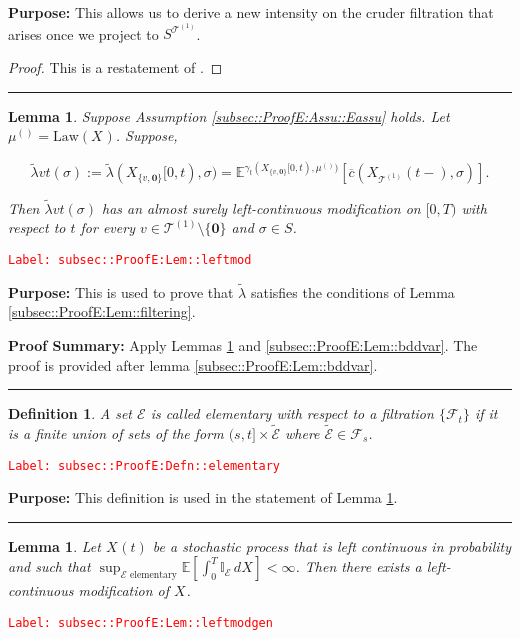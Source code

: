 \documentclass[12pt]{article}
\newcommand{\mb}{\mathbb}
\newcommand{\mc}{\mathcal}
\newcommand{\ov}{\overline}
\newcommand{\te}{\text}
\newcommand{\tr}{\textcolor{red}}
\newcommand{\labe}[1]{\tr{\texttt{Label: #1}}}
\newcommand{\purpose}{\textbf{Purpose: }}
\newcommand{\pfsum}{\textbf{Proof Summary: }}
\newcommand{\lin}{\rule{\linewidth}{0.4 pt}}
\newcommand{\ex}[1]{\mb{E}\left[#1\right]}			%
\newcommand{\exmu}[2]{\mb{E}^{#1}\left[#2\right]}	%
\renewcommand{\root}{\mathbf{0}}				%
\renewcommand{\v}{v}							%
\renewcommand{\S}{S}							%
\newcommand{\s}{\sigma}							%
\newcommand{\T}{T}								%
\renewcommand{\t}{t}							%
\renewcommand{\tt}{s}							%
\newcommand{\F}{\mc{F}}							%
\newcommand{\X}{X}								%
\newcommand{\carp}[1]{^{#1}}					%
\newcommand{\vsi}[1]{^{#1}}						%
\newcommand{\cind}[1]{_{#1}}					%
\newcommand{\tp}[1]{(#1)}						%
\newcommand{\tip}[1]{#1}						%
\newcommand{\ts}[1]{_{#1}}						%
\newcommand{\IGrg}{\ov{c}}						%
\newcommand{\tree}{\mc{T}}						%
\newcommand{\sln}[1]{^{(#1)}}					%
\newcommand{\alt}[1]{\widetilde{#1}}			%
\newcommand{\m}{\mu}							%
\newcommand{\cm}{\gamma}						%
\newcommand{\law}{\te{Law}}						%
\newcommand{\evnt}{\mc{E}}						%
\newcommand{\crate}{\alt{\lambda}}				%
\newtheorem{lem}[thms]{Lemma}
\newtheorem{defn}[thms]{Definition}
\begin{document}
\purpose This allows us to derive a new intensity on the cruder filtration that arises once we project to \(\S\carp{\tree\sln{1}}\).

\begin{proof}
This is a restatement of \cite[Theorem 14.3.III]{DalVer08}.
\end{proof}

\lin

\begin{lem}
Suppose Assumption \ref{subsec::ProofE:Assu::Eassu} holds. Let \(\m\sln{}\ts{} = \law(\X\cind{}\tip{})\). Suppose,

\[\crate{\v}{\t}(\s) := \crate{}{}(\X\cind{\{\v,\root\}}\tip{[0,\t)},\s) = \exmu{\cm\ts{\t}(\X\cind{\{\v,\root\}}\tip{[0,\t)},\m\sln{}\ts{})}{\IGrg(\X\cind{\tree\sln{1}}\tp{\t-},\s)}.\]


Then \(\crate{\v}{\t}(\s)\) has an almost surely left-continuous modification on \([0,\T)\) with respect to \(\t\) for every \(\v \in \tree\sln{1}\setminus\{\root\}\) and \(\s \in \S\).
\label{subsec::ProofE:Lem::leftmod}
\end{lem}
\labe{subsec::ProofE:Lem::leftmod}

\purpose This is used to prove that \(\crate{}{}\) satisfies the conditions of Lemma \ref{subsec::ProofE:Lem::filtering}.

\pfsum Apply Lemmas \ref{subsec::ProofE:Lem::leftmodgen} and \ref{subsec::ProofE:Lem::bddvar}. The proof is provided after lemma \ref{subsec::ProofE:Lem::bddvar}.

\lin

\begin{defn}
A set \(\evnt\) is called elementary with respect to a filtration \(\{\F\vsi{}\ts{\t}\}\) if it is a finite union of sets of the form \((\tt,\t]\times \alt{\evnt}\) where \(\alt{\evnt} \in \F\vsi{}\ts{\tt}\).
\label{subsec::ProofE:Defn::elementary}
\end{defn}
\labe{subsec::ProofE:Defn::elementary}

\purpose This definition is used in the statement of Lemma \ref{subsec::ProofE:Lem::leftmodgen}.

\lin

\begin{lem}
Let \(\X\cind{}\tp{\t}\) be a stochastic process that is left continuous in probability and such that \(\sup_{\evnt\te{ elementary}}\ex{\int_0^\T \mb{I}_\evnt\,d\X\cind{}\tip{}} < \infty\). Then there exists a left-continuous modification of \(\X\cind{}\tip{}\).
\label{subsec::ProofE:Lem::leftmodgen}
\end{lem}
\labe{subsec::ProofE:Lem::leftmodgen}
\end{document}
